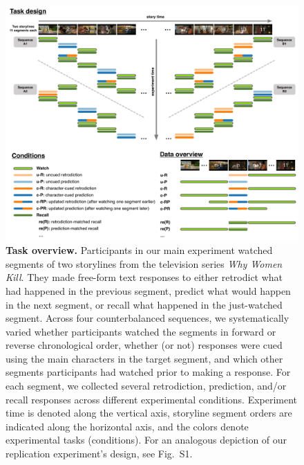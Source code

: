 \documentclass[10pt]{article}
\newcommand{\MethodsReplExp}{S1}
\begin{document}
\begin{figure}[tp]
  \centering
  \includegraphics[width=\textwidth]{methods}

  \caption{\textbf{Task overview.} Participants in our main experiment watched segments of two storylines from the television series \textit{Why Women Kill}. They made free-form text responses to either retrodict what had happened in the previous segment, predict what would happen in the next segment, or recall what happened in the just-watched segment. Across four counterbalanced sequences, we systematically varied whether participants watched the segments in forward or reverse chronological order, whether (or not) responses were cued using the main characters in the target segment, and which other segments participants had watched prior to making a response. For each segment, we collected several retrodiction, prediction, and/or recall responses across different experimental conditions. Experiment time is denoted along the vertical axis, storyline segment orders are indicated along the horizontal axis, and the colors denote experimental tasks (conditions). For an analogous depiction of our replication experiment's design, see Fig.~\MethodsReplExp.}

  \label{fig:method}
\end{figure}
\end{document}
